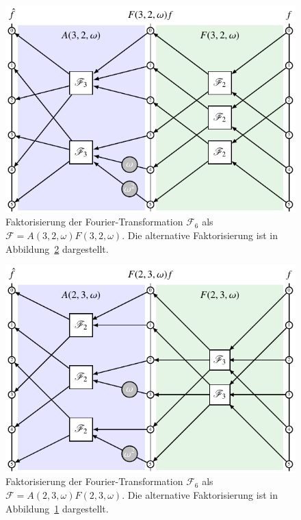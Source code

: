 \begin{figure}
\centering
\includegraphics{chapters/060-diskret/images/f32.pdf}
\caption{Faktorisierung der Fourier-Transformation $\mathscr{F}_6$ als
$\mathscr{F}=A(3,2,\omega)F(3,2,\omega)$.
Die alternative Faktorisierung ist in
Abbildung~\ref{buch:diskret:faktorisierung:fig:f23}
dargestellt.
\label{buch:diskret:faktorisierung:fig:f32}}
\end{figure}
\begin{figure}
\centering
\includegraphics{chapters/060-diskret/images/f23.pdf}
\caption{Faktorisierung der Fourier-Transformation $\mathscr{F}_6$ als
$\mathscr{F}=A(2,3,\omega)F(2,3,\omega)$.
Die alternative Faktorisierung ist in
Abbildung~\ref{buch:diskret:faktorisierung:fig:f32}
dargestellt.
\label{buch:diskret:faktorisierung:fig:f23}}
\end{figure}

